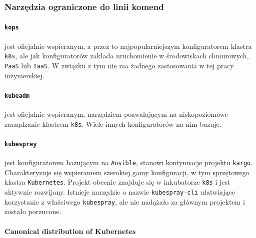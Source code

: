 \documentclass[a4paper,12pt,twoside,openany]{report}
\newcommand{\passthrough}[1]{#1}
\begin{document}
\hypertarget{narzux119dzia-ograniczone-do-linii-komend}{%
\subsubsection{Narzędzia ograniczone do linii
komend}\label{narzux119dzia-ograniczone-do-linii-komend}}

\hypertarget{kops}{%
\paragraph{\texorpdfstring{\texttt{kops}}{kops}}\label{kops}}

jest oficjalnie wspieranym, a przez to najpopularniejszym konfiguratorem
klastra \passthrough{\lstinline!k8s!}, ale jak konfiguratorów zakłada
uruchomienie w środowiskach chmurowych, \passthrough{\lstinline!PaaS!}
lub \passthrough{\lstinline!IaaS!}. W związku z tym nie ma żadnego
zastosowania w tej pracy inżynierskiej.

\hypertarget{kubeadm}{%
\paragraph{\texorpdfstring{\texttt{kubeadm}}{kubeadm}}\label{kubeadm}}

jest oficjalnie wspieranym, narzędziem pozwalającym na niskopoziomowe
zarządzanie klastrem \passthrough{\lstinline!k8s!}. Wiele innych
konfiguratorów na nim bazuje.

\hypertarget{kubespray}{%
\paragraph{\texorpdfstring{\texttt{kubespray}}{kubespray}}\label{kubespray}}

jest konfiguratorem bazującym na \passthrough{\lstinline!Ansible!},
stanowi kontynuacje projektu \passthrough{\lstinline!kargo!}.
Charakteryzuje się wspieraniem szerokiej gamy konfiguracji, w tym
sprzętowego klastra \passthrough{\lstinline!Kubernetes!}. Projekt
obecnie znajduje się w inkubatorze \passthrough{\lstinline!k8s!} i jest
aktywnie rozwijany. Istnieje narzędzie o nazwie
\passthrough{\lstinline!kubespray-cli!} ułatwiające korzystanie z
właściwego \passthrough{\lstinline!kubespray!}, ale nie nadążało za
głównym projektem i zostało porzucone.

\hypertarget{canonical-distribution-of-kubernetes}{%
\paragraph{Canonical distribution of
Kubernetes}\label{canonical-distribution-of-kubernetes}}
\end{document}
